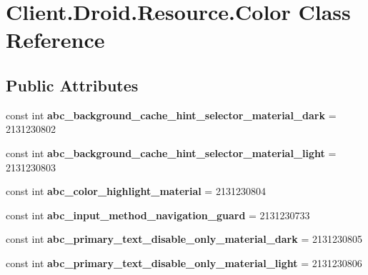 \hypertarget{classClient_1_1Droid_1_1Resource_1_1Color}{}\section{Client.\+Droid.\+Resource.\+Color Class Reference}
\label{classClient_1_1Droid_1_1Resource_1_1Color}
\subsection*{Public Attributes}
\begin{DoxyCompactItemize}
\item 
\hypertarget{classClient_1_1Droid_1_1Resource_1_1Color_a139697bc315d74d4ebcba783477391f3}{}const int {\bfseries abc\+\_\+background\+\_\+cache\+\_\+hint\+\_\+selector\+\_\+material\+\_\+dark} = 2131230802\label{classClient_1_1Droid_1_1Resource_1_1Color_a139697bc315d74d4ebcba783477391f3}

\item 
\hypertarget{classClient_1_1Droid_1_1Resource_1_1Color_ae247071b236580c6d026dd7ce24bc6b1}{}const int {\bfseries abc\+\_\+background\+\_\+cache\+\_\+hint\+\_\+selector\+\_\+material\+\_\+light} = 2131230803\label{classClient_1_1Droid_1_1Resource_1_1Color_ae247071b236580c6d026dd7ce24bc6b1}

\item 
\hypertarget{classClient_1_1Droid_1_1Resource_1_1Color_a6f7b10fdfded9495e094e322cb6da151}{}const int {\bfseries abc\+\_\+color\+\_\+highlight\+\_\+material} = 2131230804\label{classClient_1_1Droid_1_1Resource_1_1Color_a6f7b10fdfded9495e094e322cb6da151}

\item 
\hypertarget{classClient_1_1Droid_1_1Resource_1_1Color_a2343d11b49af767b14030a95ad8f5792}{}const int {\bfseries abc\+\_\+input\+\_\+method\+\_\+navigation\+\_\+guard} = 2131230733\label{classClient_1_1Droid_1_1Resource_1_1Color_a2343d11b49af767b14030a95ad8f5792}

\item 
\hypertarget{classClient_1_1Droid_1_1Resource_1_1Color_af1af50a106a428cb7531d189462811f3}{}const int {\bfseries abc\+\_\+primary\+\_\+text\+\_\+disable\+\_\+only\+\_\+material\+\_\+dark} = 2131230805\label{classClient_1_1Droid_1_1Resource_1_1Color_af1af50a106a428cb7531d189462811f3}

\item 
\hypertarget{classClient_1_1Droid_1_1Resource_1_1Color_aba9cd09ce7b9466ec5f19bd960c23187}{}const int {\bfseries abc\+\_\+primary\+\_\+text\+\_\+disable\+\_\+only\+\_\+material\+\_\+light} = 2131230806\label{classClient_1_1Droid_1_1Resource_1_1Color_aba9cd09ce7b9466ec5f19bd960c23187}


\end{DoxyCompactItemize}
